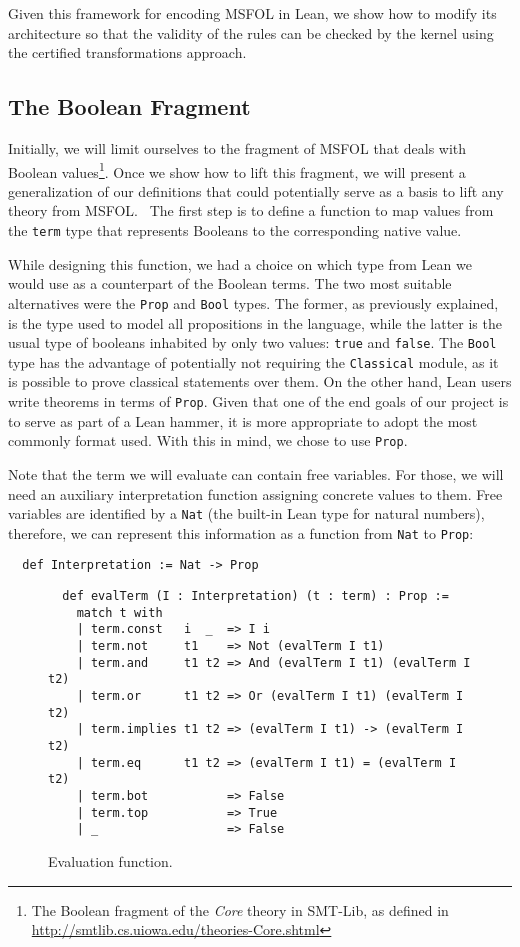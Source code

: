 Given this framework for encoding MSFOL in Lean, we show how to
modify its architecture so that the validity of the rules can be
checked by the kernel using the certified transformations approach.

\subsection{The Boolean Fragment}

Initially, we will limit ourselves to the fragment of MSFOL that
deals with Boolean values\footnote{The Boolean fragment of the
\emph{Core} theory in SMT-Lib, as defined in
\url{http://smtlib.cs.uiowa.edu/theories-Core.shtml}}. Once
we show how to lift this fragment, we will present a generalization
of our definitions that could potentially serve as a basis to lift
any theory from MSFOL.\
%
The first step is to define a function to map values from the \texttt{term} type
that represents Booleans to the corresponding native value.

While designing this function, we had a
choice on which type from Lean we would use as a counterpart of the Boolean terms. The two
most suitable alternatives were the \texttt{Prop} and \texttt{Bool} types. The former, as
previously explained, is the type used to model all propositions in the language, while
the latter is the usual type of booleans inhabited by only two values: \texttt{true} and
\texttt{false}. The \texttt{Bool} type has the advantage of potentially not requiring the
\texttt{Classical} module, as it is possible to prove classical statements over them. On
the other hand, Lean users write theorems in terms of \texttt{Prop}.
Given that one of the
end goals of our project is to serve as part of a Lean hammer, it is more appropriate
to adopt the most commonly format used. With this in mind, we chose to use \texttt{Prop}.


Note that the term we will evaluate can contain free variables. For those, we will need an auxiliary interpretation function assigning concrete values to them.
Free variables are
identified by a \texttt{Nat} (the built-in Lean type for natural numbers), therefore, we can
represent this information as a function from \texttt{Nat} to
\texttt{Prop}:

\begin{verbatim}
  def Interpretation := Nat -> Prop
\end{verbatim}


\begin{figure}[t]
\begin{verbatim}
  def evalTerm (I : Interpretation) (t : term) : Prop :=
    match t with
    | term.const   i  _  => I i
    | term.not     t1    => Not (evalTerm I t1)
    | term.and     t1 t2 => And (evalTerm I t1) (evalTerm I t2)
    | term.or      t1 t2 => Or (evalTerm I t1) (evalTerm I t2)
    | term.implies t1 t2 => (evalTerm I t1) -> (evalTerm I t2)
    | term.eq      t1 t2 => (evalTerm I t1) = (evalTerm I t2)
    | term.bot           => False
    | term.top           => True
    | _                  => False
\end{verbatim}
\caption{Evaluation function.}\label{evalTerm1}
\end{figure}

